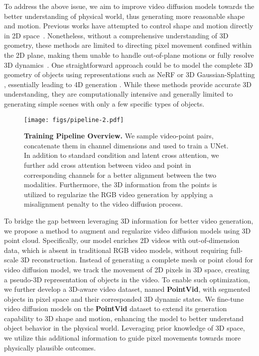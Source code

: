 To address the above issue, we aim to improve video diffusion models towards the better understanding of physical world, thus generating more reasonable shape and motion.
Previous works have attempted to control shape and motion directly in 2D space~\cite{savantaira2024motioncraft, liu2024physgen}. Nonetheless, without a comprehensive understanding of 3D geometry, these methods are limited to directing pixel movement confined within the 2D plane, making them unable to handle out-of-plane motions or fully resolve 3D dynamics~\cite{liu2024physgen}. One straightforward approach could be to model the complete 3D geometry of objects using representations such as NeRF \cite{mildenhall2021nerf} or 3D Gaussian-Splatting \cite{kerbl20233d}, essentially leading to 4D generation \cite{bahmani20244d, zhao2023animate124}. 
While these methods provide accurate 3D understanding, they are computationally intensive and generally limited to generating simple scenes with only a few specific types of objects.


\begin{figure*}[t]
\texttt{[image: figs/pipeline-2.pdf]}
\caption{\textbf{Training Pipeline Overview.} We sample video-point pairs, concatenate them in channel dimensions and used to train a UNet. In addition to standard condition and latent cross attention, we further add cross attention between video and point in corresponding channels for a better alignment between the two modalities. Furthermore, the 3D information from the points is utilized to regularize the RGB video generation by applying a misalignment penalty to the video diffusion process.
 }\label{fig:pipeline}
\end{figure*}

To bridge the gap between leveraging 3D information for better video generation, we propose a method to augment and regularize video diffusion models using 3D point cloud. Specifically, our model enriches 2D videos with out-of-dimension data, which is absent in traditional RGB video models, without requiring full-scale 3D reconstruction. Instead of generating a complete mesh or point cloud for video diffusion model, we track the movement of 2D pixels in 3D space, creating a pseudo-3D representation of objects in the video. To enable such optimization, we further develop a 3D-aware video dataset, named \textbf{PointVid}, with segmented objects in pixel space and their corresponded 3D dynamic states. We fine-tune video diffusion models on the \textbf{PointVid} dataset to extend its generation capability to 3D shape and motion, enhancing the model to better understand object behavior in the physical world. Leveraging prior knowledge of 3D space, we utilize this additional information to guide pixel movements towards more physically plausible outcomes.

